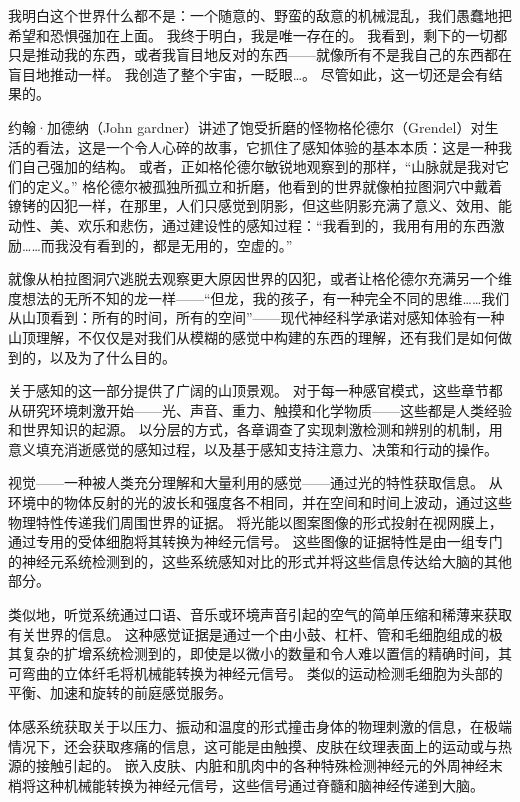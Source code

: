 我明白这个世界什么都不是：一个随意的、野蛮的敌意的机械混乱，我们愚蠢地把希望和恐惧强加在上面。
我终于明白，我是唯一存在的。
我看到，剩下的一切都只是推动我的东西，或者我盲目地反对的东西——就像所有不是我自己的东西都在盲目地推动一样。
我创造了整个宇宙，一眨眼…。
尽管如此，这一切还是会有结果的。


约翰·加德纳（John gardner）讲述了饱受折磨的怪物格伦德尔（Grendel）对生活的看法，这是一个令人心碎的故事，它抓住了感知体验的基本本质：这是一种我们自己强加的结构。
或者，正如格伦德尔敏锐地观察到的那样，“山脉就是我对它们的定义。”
格伦德尔被孤独所孤立和折磨，他看到的世界就像柏拉图洞穴中戴着镣铐的囚犯一样，在那里，人们只感觉到阴影，但这些阴影充满了意义、效用、能动性、美、欢乐和悲伤，通过建设性的感知过程：“我看到的，我用有用的东西激励……而我没有看到的，都是无用的，空虚的。”


就像从柏拉图洞穴逃脱去观察更大原因世界的囚犯，或者让格伦德尔充满另一个维度想法的无所不知的龙一样——“但龙，我的孩子，有一种完全不同的思维……我们从山顶看到：所有的时间，所有的空间”——现代神经科学承诺对感知体验有一种山顶理解，不仅仅是对我们从模糊的感觉中构建的东西的理解，还有我们是如何做到的，以及为了什么目的。


关于感知的这一部分提供了广阔的山顶景观。
对于每一种感官模式，这些章节都从研究环境刺激开始——光、声音、重力、触摸和化学物质——这些都是人类经验和世界知识的起源。
以分层的方式，各章调查了实现刺激检测和辨别的机制，用意义填充消逝感觉的感知过程，以及基于感知支持注意力、决策和行动的操作。


视觉——一种被人类充分理解和大量利用的感觉——通过光的特性获取信息。
从环境中的物体反射的光的波长和强度各不相同，并在空间和时间上波动，通过这些物理特性传递我们周围世界的证据。
将光能以图案图像的形式投射在视网膜上，通过专用的受体细胞将其转换为神经元信号。
这些图像的证据特性是由一组专门的神经元系统检测到的，这些系统感知对比的形式并将这些信息传达给大脑的其他部分。


类似地，听觉系统通过口语、音乐或环境声音引起的空气的简单压缩和稀薄来获取有关世界的信息。
这种感觉证据是通过一个由小鼓、杠杆、管和毛细胞组成的极其复杂的扩增系统检测到的，即使是以微小的数量和令人难以置信的精确时间，其可弯曲的立体纤毛将机械能转换为神经元信号。
类似的运动检测毛细胞为头部的平衡、加速和旋转的前庭感觉服务。


体感系统获取关于以压力、振动和温度的形式撞击身体的物理刺激的信息，在极端情况下，还会获取疼痛的信息，这可能是由触摸、皮肤在纹理表面上的运动或与热源的接触引起的。
嵌入皮肤、内脏和肌肉中的各种特殊检测神经元的外周神经末梢将这种机械能转换为神经元信号，这些信号通过脊髓和脑神经传递到大脑。


